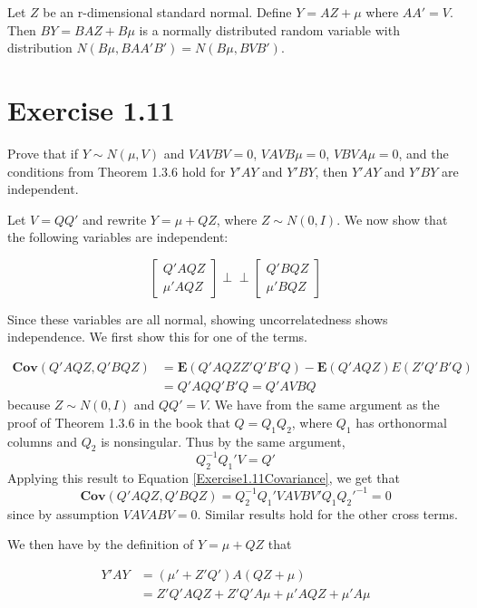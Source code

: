 \documentclass{article}
\newcommand{\indep}{\perp \!\!\! \perp}
\newcommand{\E}{\boldsymbol{E}}
\newcommand{\cov}{\boldsymbol{Cov}}
\begin{document}
Let $Z$ be an r-dimensional standard normal. Define $Y = AZ + \mu$ where $AA' = V$. Then $BY = BAZ + B\mu$ is a normally distributed random variable with distribution $N(B\mu, BAA'B') = N(B\mu, BVB')$.

\section*{Exercise 1.11}

Prove that if $Y \sim N(\mu, V)$ and $VAVBV=0$, $VAVB\mu=0$, $VBVA\mu=0$, and the conditions from Theorem 1.3.6 hold for $Y'AY$ and $Y'BY$, then $Y'AY$ and $Y'BY$ are independent.

Let $V=QQ'$ and rewrite $Y=\mu + QZ$, where $Z\sim N(0,I)$. We now show that the following variables are independent:

\begin{equation}
\label{Exercise1.11Independence}
\begin{bmatrix}
Q'AQZ \\
\mu'AQZ
\end{bmatrix}
\indep
\begin{bmatrix}
Q'BQZ \\
\mu'BQZ
\end{bmatrix}
\end{equation}

Since these variables are all normal, showing uncorrelatedness shows independence. We first show this for one of the terms.

\begin{align}
\label{Exercise1.11Covariance}
\cov(Q'AQZ, Q'BQZ) &= \E(Q'AQZZ'Q'B'Q) - \E(Q'AQZ)E(Z'Q'B'Q) \\
&= Q'AQQ'B'Q = Q'AVBQ
\end{align}
because $Z \sim N(0, I)$ and $QQ' = V$. We have from the same argument as the proof of Theorem 1.3.6 in the book that $Q = Q_1Q_2$, where $Q_1$ has orthonormal columns and $Q_2$ is nonsingular. Thus by the same argument,
\[
Q_2^{-1}Q_1'V = Q'
\]
Applying this result to Equation \ref{Exercise1.11Covariance}, we get that
\[
\cov(Q'AQZ, Q'BQZ)=Q_2^{-1}Q_1'VAVBV'Q_1Q_2'^{-1} = 0
\]
since by assumption $VAVABV=0$. Similar results hold for the other cross terms.

We then have by the definition of $Y=\mu+QZ$ that

\begin{align*}
Y'AY &= (\mu'+Z'Q')A(QZ+\mu) \\
&= Z'Q'AQZ + Z'Q'A\mu + \mu'AQZ + \mu'A\mu
\end{align*}
\end{document}

